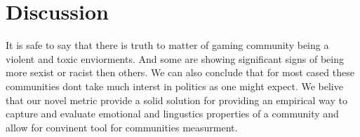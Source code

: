 \section{Discussion}
It is safe to say that there is truth to matter of gaming community being a violent and toxic enviorments. And some are showing significant signs of being more sexist or racist then others. We can also conclude that for most cased these communities dont take much interst in politics as one might expect. We belive that our novel metric provide a solid solution for providing an empirical way to capture and evaluate emotional and lingustics properties of a community and allow for convinent tool for communities measurment. 
